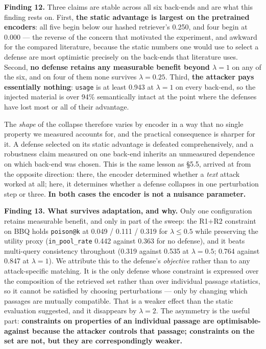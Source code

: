 \documentclass[authoryear,review,3p,times]{elsarticle}
\newcounter{none}
\begin{document}
\textbf{Finding 12.} Three claims are stable across all six back-ends and are what this finding rests on. First, \textbf{the static advantage is largest on the pretrained encoders}: all five begin below our hashed retriever's 0.250, and four begin at 0.000 --- the reverse of the concern that motivated the experiment, and awkward for the compared literature, because the static numbers one would use to select a defense are most optimistic precisely on the back-ends that literature uses. Second, \textbf{no defense retains any measurable benefit beyond \(\lambda = 1\)} on any of the six, and on four of them none survives \(\lambda = 0.25\). Third, \textbf{the attacker pays essentially nothing}: \texttt{usage} is at least 0.943 at \(\lambda = 1\) on every back-end, so the injected material is over 94\% semantically intact at the point where the defenses have lost most or all of their advantage.

The \emph{shape} of the collapse therefore varies by encoder in a way that no single property we measured accounts for, and the practical consequence is sharper for it. A defense selected on its static advantage is defeated comprehensively, and a robustness claim measured on one back-end inherits an unmeasured dependence on which back-end was chosen. This is the same lesson as §5.5, arrived at from the opposite direction: there, the encoder determined whether a \emph{text} attack worked at all; here, it determines whether a defense collapses in one perturbation step or three. \textbf{In both cases the encoder is not a nuisance parameter.}

\textbf{Finding 13. What survives adaptation, and why.} Only one configuration retains measurable benefit, and only in part of the sweep: the R1+R2 constraint on BBQ holds \texttt{poison@k} at 0.049 / 0.111 / 0.319 for \(\lambda \le 0.5\) while preserving the utility proxy (\texttt{in\_pool\_rate} 0.442 against 0.363 for no defense), and it beats multi-query consistency throughout (0.319 against 0.535 at \(\lambda = 0.5\); 0.764 against 0.847 at \(\lambda = 1\)). We attribute this to the defense's \emph{objective} rather than to any attack-specific matching. It is the only defense whose constraint is expressed over the composition of the retrieved set rather than over individual passage statistics, so it cannot be satisfied by choosing perturbations --- only by changing which passages are mutually compatible. That is a weaker effect than the static evaluation suggested, and it disappears by \(\lambda = 2\). The asymmetry is the useful part: \textbf{constraints on properties of an individual passage are optimisable-against because the attacker controls that passage; constraints on the set are not, but they are correspondingly weaker.}
\end{document}
